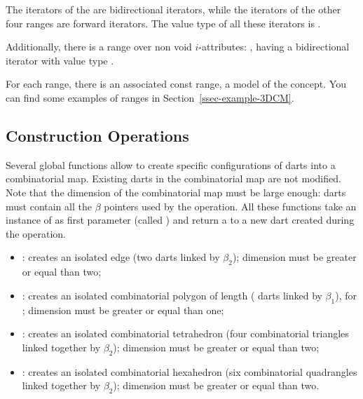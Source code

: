 The iterators of the  are bidirectional iterators, 
while the iterators of the other four ranges are forward iterators. 
The value type of all these iterators is .

Additionally, there is a range over non void $i$-attributes:
, having a bidirectional iterator with
value type .

For each range, there is an associated const range, a model of the
 concept.  You can find some examples of ranges in
Section~\ref{ssec-example-3DCM}.

\subsection{Construction Operations}\label{ssec-construction}

Several global functions allow to create specific configurations of
darts into a combinatorial map. Existing darts in the combinatorial
map are not modified. Note that the dimension of the combinatorial map
must be large enough: darts must contain all the $\beta$ pointers used by the
operation. All these functions take an instance of
 as first parameter (called ) and return
a  to a new dart created during the operation.

\begin{itemize}
\item {}: creates an isolated edge (two darts
  linked by $\beta_2$); dimension must be greater or equal than two;
\item {}: creates an
  isolated combinatorial polygon of length  ( darts
  linked by $\beta_1$), for ; dimension must be greater
  or equal than one;
\item {}: creates an
  isolated combinatorial tetrahedron (four combinatorial triangles
  linked together by $\beta_2$); dimension must be greater or equal
  than two;
\item {}: creates an
  isolated combinatorial hexahedron (six combinatorial quadrangles
  linked together by $\beta_2$); dimension must be greater or equal
  than two.
\end{itemize}

